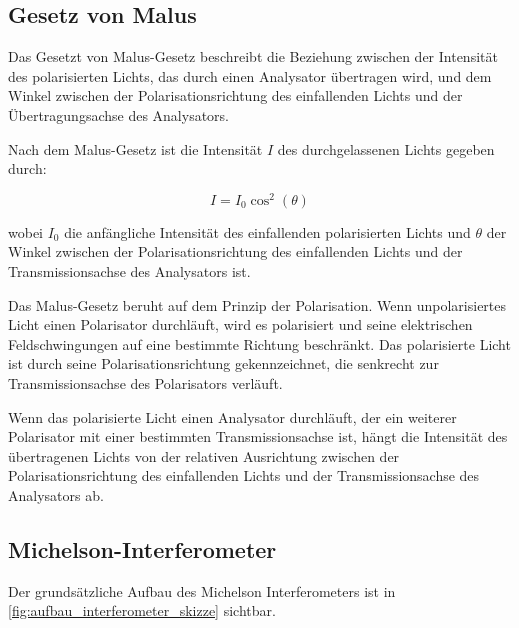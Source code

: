 \documentclass[12pt,english,ngerman]{scrartcl}
\begin{document}
\subsection{Gesetz von Malus}

Das Gesetzt von Malus-Gesetz beschreibt die Beziehung zwischen der Intensität
des polarisierten Lichts, das durch einen Analysator übertragen wird, und dem
Winkel zwischen der Polarisationsrichtung des einfallenden Lichts und der
Übertragungsachse des Analysators.

Nach dem Malus-Gesetz ist die Intensität $I$ des durchgelassenen Lichts gegeben
durch:

\begin{equation}
	I = I_0  \cos^2(\theta)
\end{equation}

wobei $I_0$ die anfängliche Intensität des einfallenden polarisierten Lichts
und $\theta$ der Winkel zwischen der Polarisationsrichtung des einfallenden
Lichts und der Transmissionsachse des Analysators ist.

Das Malus-Gesetz beruht auf dem Prinzip der Polarisation. Wenn unpolarisiertes
Licht einen Polarisator durchläuft, wird es polarisiert und seine elektrischen
Feldschwingungen auf eine bestimmte Richtung beschränkt. Das polarisierte Licht
ist durch seine Polarisationsrichtung gekennzeichnet, die senkrecht zur
Transmissionsachse des Polarisators verläuft.

Wenn das polarisierte Licht einen Analysator durchläuft, der ein weiterer
Polarisator mit einer bestimmten Transmissionsachse ist, hängt die Intensität
des übertragenen Lichts von der relativen Ausrichtung zwischen der
Polarisationsrichtung des einfallenden Lichts und der Transmissionsachse des
Analysators ab.


\subsection{Michelson-Interferometer}

Der grundsätzliche Aufbau des Michelson Interferometers ist in
\autoref{fig:aufbau_interferometer_skizze} sichtbar.
\end{document}
